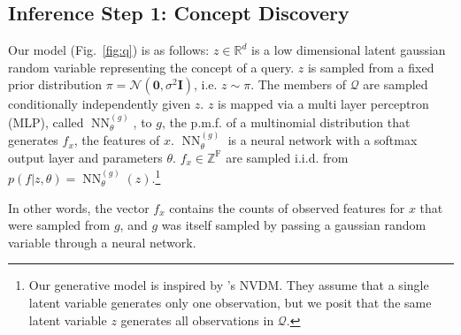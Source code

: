 \documentclass[a4paper]{article}
\newcommand{\I}{\mathbf{I}}
\newcommand{\Z}{\mathbf{0}}
\newcommand{\cN}{\mathcal{N}}
\newcommand{\cQ}{\mathcal{Q}}
\newcommand{\rF}{\mathrm{F}}
\DeclareMathOperator{\NN}{NN}
\newcommand{\gennn}{\NN^{(g)}_\theta}
\newcommand{\mynewcite}[1]{\cite{#1}}%
\begin{document}
\subsection{Inference Step 1: Concept Discovery}
\label{sec:latent-concept}
Our model (Fig.~\ref{fig:q}) is as follows: $z \in \mathbb{R}^d$ is a low dimensional latent gaussian random variable representing the concept of a query. $z$ is sampled from a fixed prior distribution $\pi = \cN(\Z, \sigma^2\I)$, i.e. $z \sim \pi$. The members of $\cQ$ are sampled conditionally independently given $z$. $z$ is mapped via a multi layer perceptron (MLP), called $\gennn$, to $g$, the p.m.f.  of a multinomial distribution that generates $f_x$, the features of $x$. $\gennn$ is a neural network with a softmax output layer and parameters $\theta$. $f_x \in \mathbb{Z}^\rF$ are sampled i.i.d. from
$p(f|z,\theta) = \gennn(z)$.\footnote{Our generative model is inspired by \mynewcite{miao2016neural}'s NVDM. %
They assume that a single latent variable generates only one observation, %
but we posit that the same
latent variable $z$ generates all %
observations in $\cQ$.}

In other words, the vector $f_x$ contains the counts of observed features for $x$ that were sampled from $g$, and $g$ was itself sampled by passing a gaussian random variable through a neural network.
\end{document}
